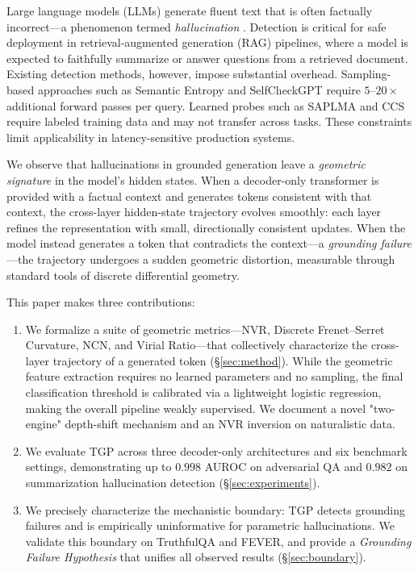 \documentclass[10pt]{article}
\newcommand{\tgp}{\textsc{TGP}\xspace}
\begin{document}
Large language models (LLMs) generate fluent text that is often factually incorrect---a phenomenon termed \emph{hallucination} \citep{ji2023survey}.
Detection is critical for safe deployment in retrieval-augmented generation (RAG) pipelines, where a model is expected to faithfully summarize or answer questions from a retrieved document.
Existing detection methods, however, impose substantial overhead.
Sampling-based approaches such as Semantic Entropy \citep{kuhn2023semantic} and SelfCheckGPT \citep{manakul2023selfcheckgpt} require $5$--$20\times$ additional forward passes per query.
Learned probes such as SAPLMA \citep{azaria2023internal} and CCS \citep{burns2022discovering} require labeled training data and may not transfer across tasks.
These constraints limit applicability in latency-sensitive production systems.

We observe that hallucinations in grounded generation leave a \emph{geometric signature} in the model's hidden states.
When a decoder-only transformer is provided with a factual context and generates tokens consistent with that context, the cross-layer hidden-state trajectory evolves smoothly: each layer refines the representation with small, directionally consistent updates.
When the model instead generates a token that contradicts the context---a \emph{grounding failure}---the trajectory undergoes a sudden geometric distortion, measurable through standard tools of discrete differential geometry.

This paper makes three contributions:
\begin{enumerate}[nosep,leftmargin=*]
    \item We formalize a suite of geometric metrics---NVR, Discrete Frenet--Serret Curvature, NCN, and Virial Ratio---that collectively characterize the cross-layer trajectory of a generated token (\S\ref{sec:method}). While the geometric feature extraction requires no learned parameters and no sampling, the final classification threshold is calibrated via a lightweight logistic regression, making the overall pipeline weakly supervised. We document a novel "two-engine" depth-shift mechanism and an NVR inversion on naturalistic data.
    \item We evaluate \tgp across three decoder-only architectures and six benchmark settings, demonstrating up to $0.998$ AUROC on adversarial QA and $0.982$ on summarization hallucination detection (\S\ref{sec:experiments}).
    \item We precisely characterize the mechanistic boundary: \tgp detects grounding failures and is empirically uninformative for parametric hallucinations. We validate this boundary on TruthfulQA and FEVER, and provide a \emph{Grounding Failure Hypothesis} that unifies all observed results (\S\ref{sec:boundary}).
\end{enumerate}
\end{document}
